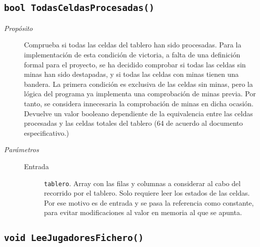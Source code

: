 \documentclass[12pt]{article}
\begin{document}
\subsection*{\texttt{bool TodasCeldasProcesadas()}}

\begin{description}

\item[\emph{Propósito}]

Comprueba si todas las celdas del tablero han sido procesadas. Para la
implementación de esta condición de victoria, a falta de una definición formal
para el proyecto, se ha decidido comprobar si todas las celdas sin minas han
sido destapadas, y si todas las celdas con minas tienen una bandera. La primera
condición es exclusiva de las celdas sin minas, pero la lógica del programa ya
implementa una comprobación de minas previa. Por tanto, se considera innecesaria
la comprobación de minas en dicha ocasión. Devuelve un valor booleano
dependiente de la equivalencia entre las celdas procesadas y las celdas totales
del tablero (64 de acuerdo al documento especificativo.)

\item[\emph{Parámetros}] \leavevmode

\begin{description}

\item[Entrada] \texttt{tablero}. Array con las filas y columnas a
considerar al cabo del recorrido por el tablero. Solo requiere leer los estados
de las celdas. Por ese motivo es de entrada y se pasa la referencia como
constante, para evitar modificaciones al valor en memoria al que se apunta.

\end{description}

\end{description}

\subsection*{\texttt{void LeeJugadoresFichero()}}
\end{document}
